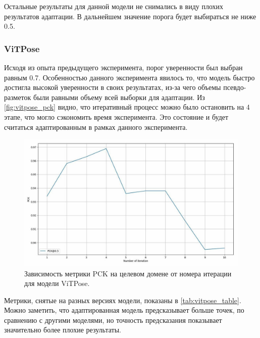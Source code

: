 Остальные результаты для данной модели не снимались в виду плохих результатов адаптации. В дальнейшем значение порога будет выбираться не ниже 0.5.

\subsubsection*{ViTPose}

Исходя из опыта предыдущего эксперимента, порог уверенности был выбран равным 0.7. Особенностью данного эксперимента явилось то, что модель быстро достигла высокой уверенности в своих результатах, из-за чего объемы псевдо-разметок были равными объему всей выборки для адаптации. Из \autoref{fig:vitpose_pck} видно, что итеративный процесс можно было остановить на 4 этапе, что могло сэкономить время эксперимента. Это состояние и будет считаться адаптированным в рамках данного эксперимента.

\begin{figure}[H]
	\centering
	\includegraphics[width=\textwidth]{./images/results/vitpose/vitpose_pck}
	\caption{Зависимость метрики PCK на целевом домене от номера итерации для модели ViTPose.}
	\label{fig:vitpose_pck}
\end{figure}

Метрики, снятые на разных версиях модели, показаны в \autoref{tab:vitpose_table}. Можно заметить, что адаптированная модель предсказывает больше точек, по сравнению с другими моделями, но точность предсказания показывает значительно более плохие результаты. 

